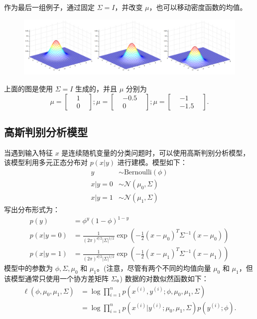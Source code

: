 作为最后一组例子，通过固定 $\Sigma = I$，并改变 $\mu$，也可以移动密度函数的均值。

\begin{figure}[H]
    \centering
    \includegraphics[width=1.0\linewidth]{figs/gaussian_density3.png}
\end{figure}

上面的图是使用 $\Sigma = I$ 生成的，并且 $\mu$ 分别为
\[
    \mu = \begin{bmatrix} &1& \\ &0& \end{bmatrix}; \mu = \begin{bmatrix} &-0.5& \\ &0& \end{bmatrix}; \mu = \begin{bmatrix} &-1& \\ &-1.5& \end{bmatrix}.
\]

\subsection{高斯判别分析模型}

当遇到输入特征 $x$ 是连续随机变量的分类问题时，可以使用高斯判别分析模型，该模型利用多元正态分布对 $p(x|y)$ 进行建模。模型如下：
\[
\begin{aligned}
    y &\sim \text{Bernoulli}(\phi) \\
    x|y=0 &\sim \mathcal{N}(\mu_0, \Sigma) \\
    x|y=1 &\sim \mathcal{N}(\mu_1, \Sigma)
\end{aligned}
\]
写出分布形式为：
\[
\begin{aligned}
    p(y) &= \phi^y (1-\phi)^{1-y} \\
    p(x|y=0) &= \frac{1}{(2\pi)^{d/2}|\Sigma|^{1/2}} \exp\left(-\frac{1}{2}(x-\mu_0)^T \Sigma^{-1} (x-\mu_0)\right) \\
    p(x|y=1) &= \frac{1}{(2\pi)^{d/2}|\Sigma|^{1/2}} \exp\left(-\frac{1}{2}(x-\mu_1)^T \Sigma^{-1} (x-\mu_1)\right)
\end{aligned}
\]
模型中的参数为 $\phi, \Sigma, \mu_0$ 和 $\mu_1$。(注意，尽管有两个不同的均值向量 $\mu_0$ 和 $\mu_1$，但该模型通常只使用一个协方差矩阵 $\Sigma$。) 数据的对数似然函数如下：
\[
\begin{aligned}
    \ell(\phi, \mu_0, \mu_1, \Sigma) &= \log \prod_{i=1}^n p(x^{(i)}, y^{(i)}; \phi, \mu_0, \mu_1, \Sigma) \\
    &= \log \prod_{i=1}^n p(x^{(i)}|y^{(i)}; \mu_0, \mu_1, \Sigma) p(y^{(i)}; \phi).
\end{aligned}
\]

